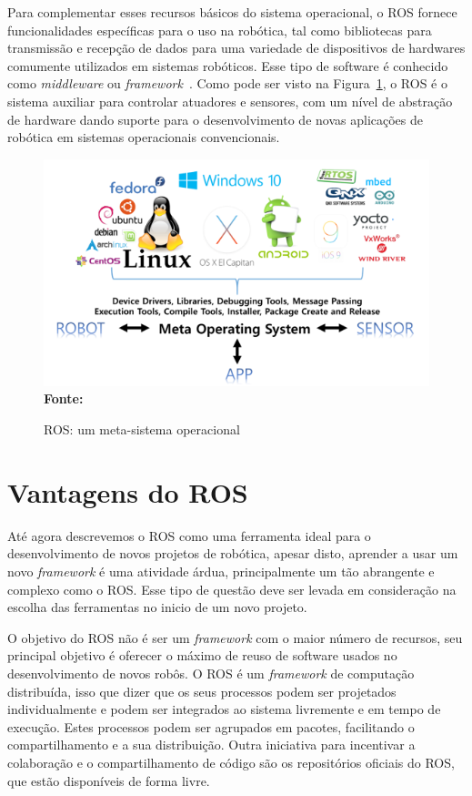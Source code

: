 Para complementar esses recursos básicos do sistema operacional, o ROS fornece funcionalidades específicas para o uso na robótica, tal como bibliotecas para transmissão e recepção de dados para uma variedade de dispositivos de hardwares comumente utilizados em sistemas robóticos. Esse tipo de software é conhecido como \textit{middleware} ou \textit{framework}~\cite{rosPYO}. Como pode ser visto na Figura~\ref{fig:rosmeta}, o ROS é o sistema auxiliar para controlar atuadores e sensores, com um nível de abstração de hardware dando suporte para o desenvolvimento de novas aplicações de robótica em sistemas operacionais convencionais.

\begin{figure}[ht]
	\caption{ROS: um meta-sistema operacional}
	\begin{center}
		\includegraphics[scale=0.6]{imagens/metaOS.png}\\
		{\small \textbf{Fonte:} }
    \end{center}\label{fig:rosmeta}
\end{figure}


\section{Vantagens do ROS}
Até agora descrevemos o ROS como uma ferramenta ideal para o desenvolvimento de novos projetos de robótica, apesar disto, aprender a usar um novo \textit{framework} é uma atividade árdua, principalmente um tão abrangente e complexo como o ROS\@. Esse tipo de questão deve ser levada em consideração na escolha das ferramentas no inicio de um novo projeto. 

O objetivo do ROS não é ser um \textit{framework} com o maior número de recursos, seu principal objetivo é oferecer o máximo de reuso de software usados no desenvolvimento de novos robôs. O ROS é um \textit{framework} de computação distribuída, isso que dizer que os seus processos podem ser projetados individualmente e podem ser integrados ao sistema livremente e em tempo de execução. Estes processos podem ser agrupados em pacotes, facilitando o compartilhamento e a sua distribuição. Outra iniciativa para incentivar a colaboração e o compartilhamento de código são os repositórios oficiais do ROS, que estão disponíveis de forma livre. 

